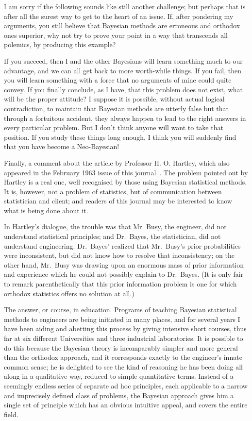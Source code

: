 \documentclass[12pt]{article}
\let\oldcite\cite
\renewcommand{\cite}{~\oldcite}
\begin{document}
I am sorry if the following sounds like still another challenge; but perhaps that is after all the surest way to get to the heart of an issue.
If, after pondering my arguments, you still believe that Bayesian methods are erroneous and orthodox ones superior, why not try to prove your point in a way that transcends all polemics, by producing this example?

If you succeed, then I and the other Bayesians will learn something much to our advantage, and we can all get back to more worth-while things. If you fail, then you will learn something with a force that no arguments of mine could quite convey. If you finally conclude, as I have, that this problem does not exist, what will be the proper attitude? I suppose it is possible, without actual logical contradiction, to maintain that Bayesian methods are utterly false but that through a fortuitous accident, they always happen to lead to the right answers in every particular problem. But I don't think anyone will want to take that position. If you study these things long enough, I think you will suddenly find that you have become a Neo-Bayesian!

Finally, a comment about the article by Professor H. O. Hartley, which also appeared in the February 1963 issue of this journal\cite{hartley}. The problem pointed out by Hartley is a real one, well recognised by those using Bayesian statistical methods. It is, however, not a problem of statistics, but of communication between statistician and client; and readers of this journal may be interested to know what is being done about it.

In Hartley's dialogue, the trouble was that Mr. Busy, the engineer,
did not understand statistical principles; and Dr.~Bayes, the statistician,
did not understand engineering. Dr.~Bayes' realized that Mr.~Busy's
prior probabilities were inconsistent, but did not know how to
resolve that inconsistency; on the other hand, Mr.~Busy was drawing
upon an enormous mass of prior information and experience which he
could not possibly explain to Dr.~Bayes. (It is only fair to remark
parenthetically that this prior information problem
is one for which orthodox statistics offers no solution at all.)

The answer, or course, in education. Programs of teaching Bayesian
statistical methods to engineers are being initiated in many places,
and for several years I have been aiding and abetting this process by
giving intensive short courses, thus far at six different Universities
and three industrial laboratories. It is possible to do this because
the Bayesian theory is incomparably simpler and more general than the
orthodox approach, and it corresponds exactly to the engineer's innate
common sense; he is delighted to see the kind of reasoning he has been
doing all along in a qualitative way, reduced to simple quantitative
terms. Instead of a seemingly endless series of separate ad hoc
principles, each applicable to a narrow and imprecisely defined class
of problems, the Bayesian approach gives him a single set of principle
which has an obvious intuitive appeal, and covers the entire field.
\end{document}
